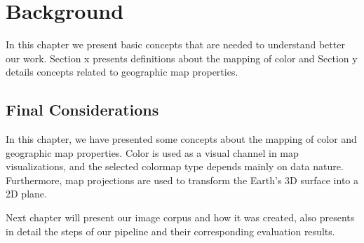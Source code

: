 \chapter{Background}
\label{ch:background}
In this chapter we present basic concepts that are needed to understand better our work. Section x presents definitions about the mapping of color and Section y details concepts related to geographic map properties.

\section{Final Considerations}
In this chapter, we have presented some concepts about the mapping of color and geographic map properties. Color is used as a visual channel in map visualizations, and the selected colormap type depends mainly on data nature. Furthermore, map projections are used to transform the Earth's 3D surface into a 2D plane.

Next chapter will present our image corpus and how it was created, also presents in detail the steps of our pipeline and their corresponding evaluation results.

